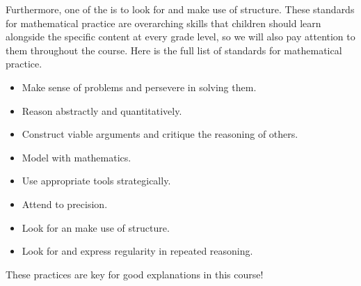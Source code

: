 \documentclass{ximera}
\begin{document}
Furthermore, one of the  is to look for and make use of structure. These standards for mathematical practice are overarching skills that children should learn alongside the specific content at every grade level, so we will also pay attention to them throughout the course. Here is the full list of standards for mathematical practice.
\begin{itemize}
\item Make sense of problems and persevere in solving them.
\item Reason abstractly and quantitatively.
\item Construct viable arguments and critique the reasoning of others.
\item Model with mathematics.
\item Use appropriate tools strategically.
\item Attend to precision.
\item Look for an make use of structure.
\item Look for and express regularity in repeated reasoning.
\end{itemize}
These practices are key for good explanations in this course!
\end{document}
